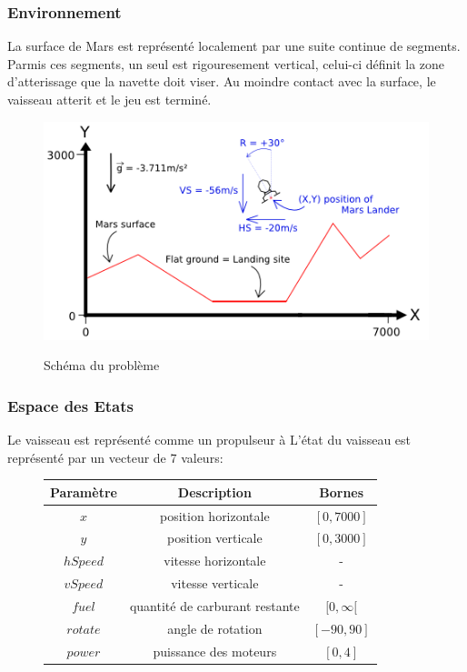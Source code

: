 \documentclass[french,a4paper,10pt,twocolumn]{article}
\begin{document}
\subsubsection{Environnement}

La surface de Mars est représenté localement par une suite continue de segments.
Parmis ces segments, un seul est rigouresement vertical, celui-ci définit la zone d'atterissage que la navette doit viser.
Au moindre contact avec la surface, le vaisseau atterit et le jeu est terminé.


\begin{figure}[H]
    \centering
    \includegraphics[scale=0.5]{images/marslander.png}
    \caption{Schéma du problème}\label{fig:marslander}
    \cite[]{codingame_mars_lander}
\end{figure}

\subsubsection{Espace des Etats}

Le vaisseau est représenté comme un propulseur à 
L'état du vaisseau est représenté par un vecteur de 7 valeurs:

\begin{figure}[H]
    \centering
    \begin{tabular}{|c|c|c|}
        \hline
        \textbf{Paramètre} & \textbf{Description} & \textbf{Bornes} \\
        \hline
        $x$       & position horizontale & $[0, 7000]$ \\
        \hline
        $y$       & position verticale   & $[0, 3000]$ \\
        \hline
        $hSpeed$  & vitesse horizontale  & - \\
        \hline
        $vSpeed$  & vitesse verticale    & - \\
        \hline
        $fuel$    & quantité de carburant restante & $[0, \infty[$ \\
        \hline
        $rotate$  & angle de rotation    & $[-90, 90]$ \\
        \hline
        $power$   & puissance des moteurs & $[0, 4]$ \\
        \hline
    \end{tabular}
\end{figure}
\end{document}
